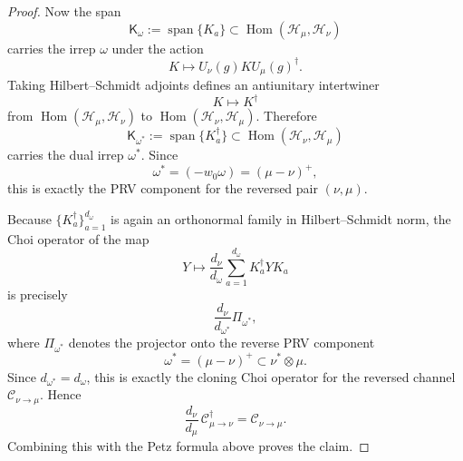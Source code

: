 \documentclass[a4paper,onecolumn,11pt]{quantumarticle}
\def\C{\mathcal{C}}
\begin{document}
\begin{proof}
Now the span
\[
\mathsf K_\omega:= \operatorname{span}\{K_a\}
\subset \operatorname{Hom}(\mathcal H_\mu,\mathcal H_\nu)
\]
carries the irrep \(\omega\) under the action
\[
K\longmapsto U_\nu(g) K U_\mu(g)^\dagger.
\]
Taking Hilbert--Schmidt adjoints defines an antiunitary intertwiner
\[
K\longmapsto K^\dagger
\]
from \(\operatorname{Hom}(\mathcal H_\mu,\mathcal H_\nu)\) to \(\operatorname{Hom}(\mathcal H_\nu,\mathcal H_\mu)\). Therefore
\[
\mathsf K_{\omega^*}:= \operatorname{span}\{K_a^\dagger\}
\subset \operatorname{Hom}(\mathcal H_\nu,\mathcal H_\mu)
\]
carries the dual irrep \(\omega^*\). Since
\[
\omega^*=(-w_0\omega)=(\mu-\nu)^+,
\]
this is exactly the PRV component for the reversed pair \((\nu,\mu)\).

Because \(\{K_a^\dagger\}_{a=1}^{d_\omega}\) is again an orthonormal family in Hilbert--Schmidt norm, the Choi operator of the map
\[
Y\longmapsto \frac{d_\nu}{d_\omega}\sum_{a=1}^{d_\omega}K_a^\dagger Y K_a
\]
is precisely
\[
\frac{d_\nu}{d_{\omega^*}}\Pi_{\omega^*},
\]
where \(\Pi_{\omega^*}\) denotes the projector onto the reverse PRV component
\[
\omega^*=(\mu-\nu)^+\subset \nu^*\otimes \mu.
\]
Since \(d_{\omega^*}=d_\omega\), this is exactly the cloning Choi operator for the reversed channel \(\C_{\nu\to\mu}\). Hence
\[
\frac{d_\nu}{d_\mu}\,\C_{\mu\to\nu}^{\dagger}
=
\C_{\nu\to\mu}.
\]
Combining this with the Petz formula above proves the claim.
\end{proof}
\end{document}
